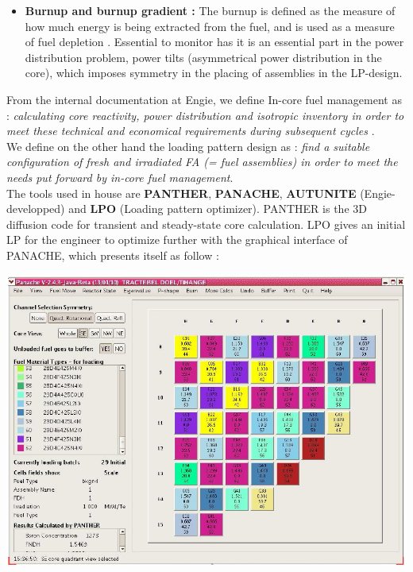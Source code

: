 \begin{itemize}
\item \textbf{Burnup and burnup gradient : } The burnup is defined as the measure of how much energy is being extracted from the fuel, and is used as a measure of fuel depletion \cite{burnup}. Essential to monitor has it is an essential part in the power distribution problem, power tilts (asymmetrical power distribution in the core), which imposes symmetry in the placing of assemblies in the LP-design. 
\end{itemize}

\noindent From the internal documentation at Engie, we define In-core fuel management as : 
\textit{calculating core reactivity, power distribution and isotropic inventory in order to meet these technical and economical requirements during subsequent cycles} \cite{engie19}. \\

\noindent We define on the other hand the loading pattern design as : \textit{find a suitable configuration of fresh and irradiated FA (= fuel assemblies) in order to meet the needs put forward by in-core fuel management}. \\

\noindent The tools used in house are \textbf{PANTHER}, \textbf{PANACHE}, \textbf{AUTUNITE} (Engie-developped) and \textbf{LPO} (Loading pattern optimizer). PANTHER is the 3D diffusion code for transient and steady-state core calculation. LPO gives an initial LP for the engineer to optimize further with the graphical interface of PANACHE, which presents itself as follow :

\includegraphics[scale = 0.6]{Figures/panther.png} \\

